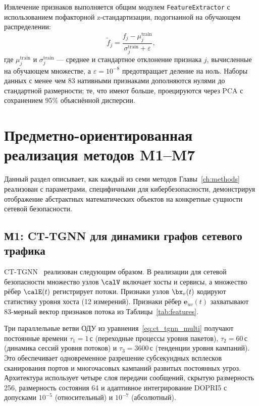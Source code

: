 Извлечение признаков выполняется общим модулем \texttt{FeatureExtractor} с использованием пофакторной z-стандартизации, подогнанной на обучающем распределении:
\begin{equation}
\tilde{f}_j = \frac{f_j - \mu_j^{\mathrm{train}}}{\sigma_j^{\mathrm{train}} + \varepsilon},
\label{eq:zscore}
\end{equation}
где $\mu_j^{\mathrm{train}}$ и $\sigma_j^{\mathrm{train}}$ --- среднее и стандартное отклонение признака $j$, вычисленные на обучающем множестве, а $\varepsilon=10^{-8}$ предотвращает деление на ноль. Наборы данных с менее чем 83 нативными признаками дополняются нулями до стандартной размерности; те, что имеют больше, проецируются через PCA с сохранением 95\% объяснённой дисперсии.


\section{Предметно-ориентированная реализация методов M1--M7}
\label{sec:method_instantiation}

Данный раздел описывает, как каждый из семи методов Главы~\ref{ch:methods} реализован с параметрами, специфичными для кибербезопасности, демонстрируя отображение абстрактных математических объектов на конкретные сущности сетевой безопасности.


\subsection{М1: CT-TGNN для динамики графов сетевого трафика}

CT-TGNN~\cite{Anaedevha2025cais} реализован следующим образом. В реализации для сетевой безопасности множество узлов $\calV$ включает хосты и сервисы, а множество рёбер $\calE(t)$ регистрирует потоки. Признаки узлов $\bx_v(t)$ кодируют статистику уровня хоста (12 измерений). Признаки рёбер $\mathbf{e}_{uv}(t)$ захватывают 83-мерный вектор признаков потока из Таблицы~\ref{tab:features}.

Три параллельные ветви ОДУ из уравнения~\eqref{eq:ct_tgnn_multi} получают постоянные времени $\tau_1=1$\,с (переходные процессы уровня пакетов), $\tau_2=60$\,с (динамика сессий уровня потоков) и $\tau_3=3600$\,с (тенденции уровня кампаний). Это обеспечивает одновременное разрешение субсекундных всплесков сканирования портов и многочасовых кампаний развитых постоянных угроз. Архитектура использует четыре слоя передачи сообщений, скрытую размерность 256, размерность состояния 64 и адаптивное интегрирование DOPRI5 с допусками $10^{-5}$ (относительный) и $10^{-7}$ (абсолютный).

